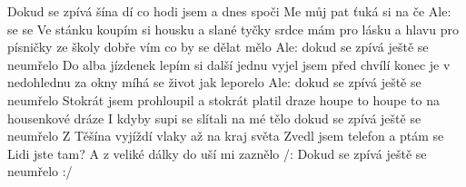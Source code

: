 \begin{TEXT}{Dokud se zpívá} %
\SLOKA {}šína dí  co hodi    \NL
{} jsem  a  dnes spoči    \NL
{} Me můj pat ťuká si na če  \NL
Ale:  se   se    
\SLOKA Ve stánku koupím si housku a slané tyčky \NL
srdce mám pro lásku a hlavu pro písničky \NL
ze školy dobře vím co by se dělat mělo \NL
Ale: dokud se zpívá ještě se neumřelo 
\SLOKA Do alba jízdenek lepím si další jednu \NL
vyjel jsem před chvílí konec je v nedohlednu \NL
za okny míhá se život jak leporelo \NL
Ale: dokud se zpívá ještě se neumřelo 
\SLOKA Stokrát jsem prohloupil a stokrát platil draze \NL
houpe to houpe to na housenkové dráze \NL
I kdyby supi se slítali na mé tělo \NL
dokud se zpívá ještě se neumřelo 
\SLOKA Z Těšína vyjíždí vlaky až na kraj světa \NL
Zvedl jsem telefon a ptám se Lidi jste tam? \NL
A z veliké dálky do uší mi zaznělo \NL
/: Dokud se zpívá ještě se neumřelo :/ \NL
\end{TEXT}
